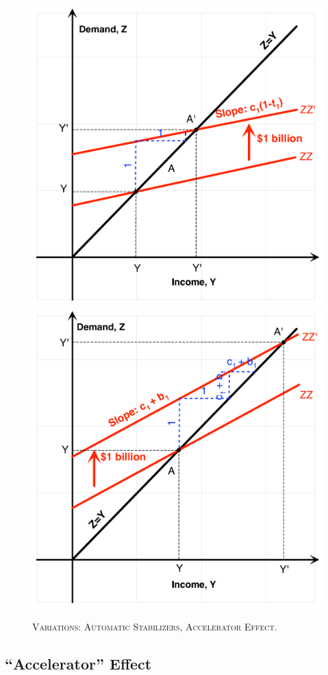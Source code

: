 \documentclass[]{book}
\theoremstyle{definition}
\theoremstyle{definition}
\theoremstyle{definition}
\theoremstyle{remark}
\begin{document}
\begin{figure}

{\centering \includegraphics[width=0.49\linewidth,height=0.49\textheight]{graphsketcher/keynesian-cross-stabilizer} \includegraphics[width=0.49\linewidth,height=0.49\textheight]{graphsketcher/keynesian-cross-accelerator} 

}

\caption{\textsc{Variations: Automatic Stabilizers,
Accelerator Effect}.}\label{fig:keynes-variations}
\end{figure}

\subsection{\texorpdfstring{``Accelerator''
Effect}{Accelerator Effect}}\label{accelerator}
\end{document}

